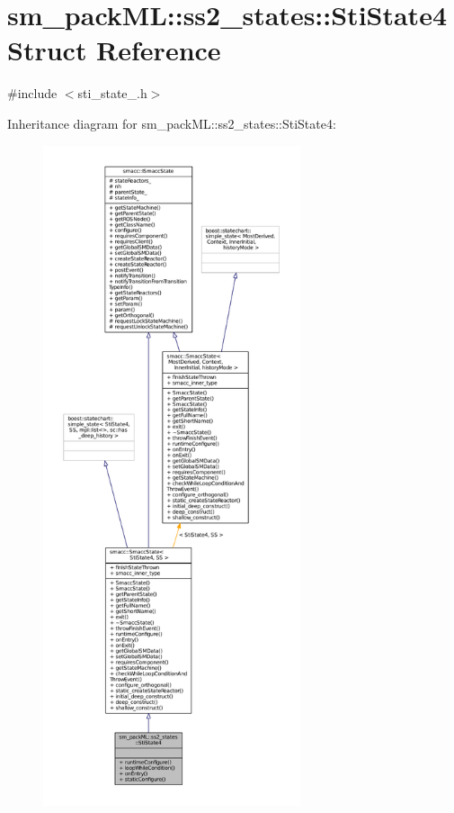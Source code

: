\hypertarget{structsm__packML_1_1ss2__states_1_1StiState4}{}\section{sm\+\_\+pack\+ML\+:\+:ss2\+\_\+states\+:\+:Sti\+State4 Struct Reference}
\label{structsm__packML_1_1ss2__states_1_1StiState4}


{\ttfamily \#include $<$sti\+\_\+state\+\_.\+h$>$}



Inheritance diagram for sm\+\_\+pack\+ML\+:\+:ss2\+\_\+states\+:\+:Sti\+State4\+:
\nopagebreak
\begin{figure}[H]
\begin{center}
\leavevmode
\includegraphics[height=550pt]{structsm__packML_1_1ss2__states_1_1StiState4__inherit__graph}
\end{center}
\end{figure}


